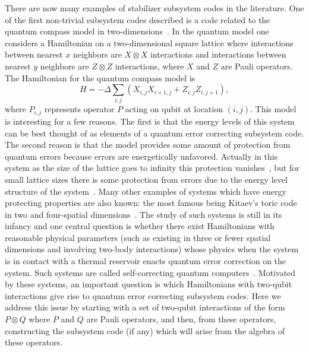 \documentclass[twocolumn,showpacs,preprintnumbers,amsmath,amssymb,nofootinbib,pra,floatfix]{revtex4-1}
\begin{document}
There are now many examples of stabilizer subsystem codes in the literature.  One of the first non-trivial subsystem codes described is a code related to the quantum compass model in two-dimensions~\cite{Bacon:01a,Dorier:05a,Bacon:06a}.  In the quantum model one considers a Hamiltonian on a two-dimensional square lattice where interactions between nearest $x$ neighbors are $X \otimes X$ interactions and interactions between nearest $y$ neighbors are $Z \otimes Z$ interactions, where $X$ and $Z$ are Pauli operators.  The Hamiltonian for the quantum compass model is
\begin{equation}
H=-\Delta \sum_{i,j} (X_{i,j} X_{i+1,j} +Z_{i,j} Z_{i,j+1}),
\end{equation}
where $P_{i,j}$ represents operator $P$ acting on qubit at location $(i,j)$.  This model is interesting for a few reasons.  The first is that the energy levels of this system can be best thought of as elements of a quantum error correcting subsystem code.  The second reason is that the model provides some amount of protection from quantum errors because errors are energetically unfavored.  Actually in this system as the size of the lattice goes to infinity this protection vanishes~\cite{Dorier:05a}, but for small lattice sizes there is some protection from errors due to the energy level structure of the system~\cite{Bacon:01a}.  Many other examples of systems which have energy protecting properties are also known: the most famous being Kitaev's toric code in two and four-spatial dimensions~\cite{Kitaev:97c,Kitaev:03a,Dennis:02a}.  The study of such systems is still in its infancy and one central question is whether there exist Hamiltonians with reasonable physical parameters (such as existing in three or fewer spatial dimensions and involving two-body interactions) whose physics when the system is in contact with a thermal reservoir enacts quantum error correction on the system.  Such systems are called self-correcting quantum computers~\cite{Bacon:06a,Bombin:09a}.  Motivated by these systems, an important question is which Hamiltonians with two-qubit interactions give rise to quantum error correcting subsystem codes.  Here we address this issue by starting with a set of two-qubit interactions of the form $P\otimes Q$ where $P$ and $Q$ are Pauli operators, and then, from these operators, constructing the subsystem code (if any) which will arise from the algebra of these operators.
\end{document}
